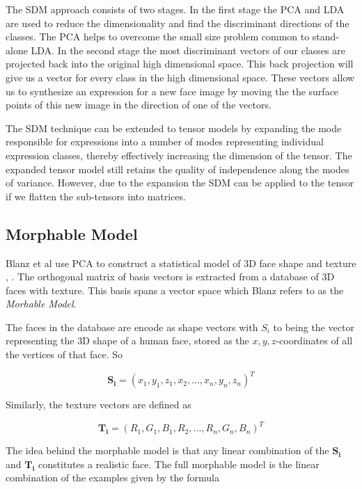 \documentclass[11pt,a4paper]{report}
\begin{document}
The SDM approach consists of two stages. In the first stage the PCA
and LDA are used to reduce the dimensionality and find the discriminant
directions of the classes. The PCA helps to overcome the small size problem
common to stand-alone LDA. In the second stage the most discriminant vectors of
our classes are projected back into the original high dimensional space. This
back projection will give us a vector for every class in the high dimensional
space. These vectors allow us to synthesize an expression for a new face image by moving the the surface
points of this new image in the direction of one of the vectors. 

The SDM technique can be extended to tensor models by expanding the mode
responsible for expressions into a number of modes representing
individual expression classes, thereby effectively increasing the dimension of
the tensor. The expanded tensor model still retains the quality of independence
along the modes of variance. However, due to the expansion the SDM can be
applied to the tensor if we flatten the sub-tensors into matrices.


\subsection{Morphable Model}
Blanz et al use PCA to construct a statistical model of 3D face shape and
texture \cite{blanz1}, \cite{blanz2}. The orthogonal matrix of basis vectors is
extracted from a database of 3D faces with texture. This basis spans a vector
space which Blanz refers to as the \textit{Morhable Model}.

The faces in the database are encode as shape vectors with $S_i$ to being the vector representing the 3D shape of a human
face, stored as the $x,y,z$-coordinates of all the vertices of that face. So

\begin{equation}
\mathbf{S_i} = (x_1,y_1,z_1,x_2,...,x_n,y_n,z_n)^T
\end{equation}

Similarly, the texture vectors are defined as

\begin{equation}
\mathbf{T_i} = (R_1,G_1,B_1,R_2,...,R_n,G_n,B_n)^T
\end{equation}

The idea behind the morphable model is that any linear combination of the
$\mathbf{S_i}$ and $\mathbf{T_i}$ constitutes a realistic face. The full
morphable model is the linear combination of the examples given by the formula
\end{document}
